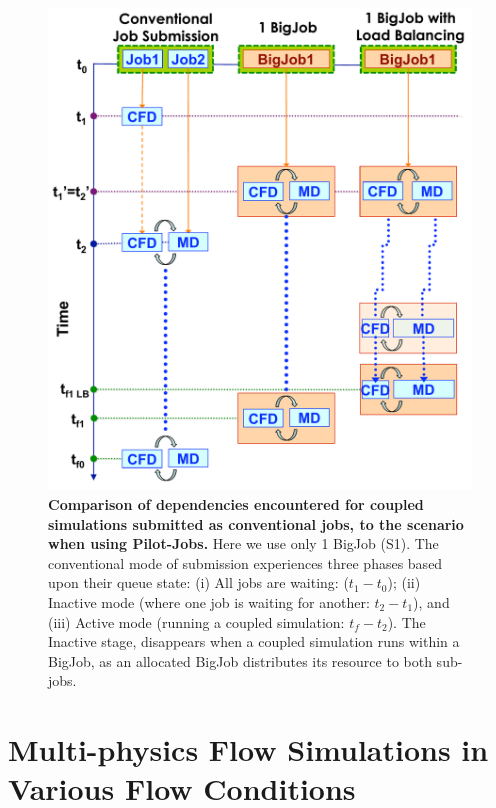 \documentclass[preprint,12pt]{elsarticle}
\begin{document}
\begin{figure}
\centering
\includegraphics[width=0.8\linewidth]{Single_BigJob_Scenarios_new.pdf}
\caption{\small {\bf Comparison of dependencies encountered for coupled
  simulations submitted as conventional jobs, to the scenario when
  using Pilot-Jobs.} Here we use only 1 BigJob (S1). The conventional
  mode of submission experiences three phases based upon their queue
  state: (i) All jobs are waiting: ($t_1-t_0$); (ii) Inactive mode
  (where one job is waiting for another: $t_2-t_1$), and (iii) Active
  mode (running a coupled simulation: $t_f-t_2$). The Inactive stage,
  disappears when a coupled simulation runs within a BigJob, as an
  allocated BigJob distributes its resource to both sub-jobs.}
\label{Fig:OneBJ_Flow}
\vspace{-1em}
\end{figure}



\section{Multi-physics Flow Simulations in Various Flow Conditions}
\label{sec:accuracy}
\end{document}
